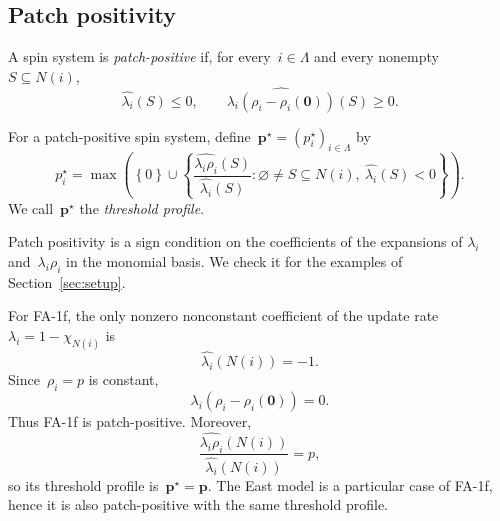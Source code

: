 \documentclass[EJP,preprint,NODS,nobera]{ejpecp}
\newcommand{\bb}[1]{\left(#1\right)}
\newcommand{\cb}[1]{\left\{#1\right\}}
\newcommand{\vn}{\varnothing}
\newcommand{\mb}[1]{\mathbf{#1}}
\begin{document}
\subsection{Patch positivity}
\label{subsec:patch-positivity}

\begin{definition}
\label{def:patch-positivity}
A spin system is \emph{patch-positive} if, for every~$i\in\Lambda$ and every
nonempty~$S\subseteq N(i)$,
\begin{equation}
\label{eq:patch-positivity}
\widehat{\lambda_i}(S)\leq0,
\qquad
\widehat{\lambda_i\bb{\rho_i-\rho_i(\mb 0)}}(S)\geq0.
\end{equation}
\end{definition}

\begin{definition}
For a patch-positive spin system, define~$\mb p^\star=(p_i^\star)_{i\in\Lambda}$ by
\begin{equation}
\label{eq:threshold-profile}
p_i^\star
=
\max\bb{
\cb{0}
\cup
\cb{
\frac{\widehat{\lambda_i\rho_i}(S)}
{\widehat{\lambda_i}(S)}
:
\vn\neq S\subseteq N(i),\ 
\widehat{\lambda_i}(S)<0
}
}.
\end{equation}
We call~$\mb p^\star$ the \emph{threshold profile}.
\end{definition}

Patch positivity is a sign condition on the coefficients of the expansions of
$\lambda_i$ and~$\lambda_i\rho_i$ in the monomial basis. We check it for the
examples of Section~\ref{sec:setup}.

\begin{example}
\label{ex:pp-fa-east}
For FA-1f, the only nonzero nonconstant coefficient of the update rate~$\lambda_i=1-\chi_{N(i)}$ is
\begin{equation*}
\widehat{\lambda_i}\bb{N(i)}=-1.
\end{equation*}
Since~$\rho_i=p$ is constant,
\begin{equation*}
\lambda_i\bb{\rho_i-\rho_i(\mb 0)}=0.
\end{equation*}
Thus FA-1f is patch-positive. Moreover,
\begin{equation*}
\frac{\widehat{\lambda_i\rho_i}\bb{N(i)}}
{\widehat{\lambda_i}\bb{N(i)}}
=p,
\end{equation*}
so its threshold profile is~$\mb p^\star=\mb p$.
The East model is a particular case of FA-1f, hence it is also patch-positive with the same threshold profile.
\end{example}
\end{document}
